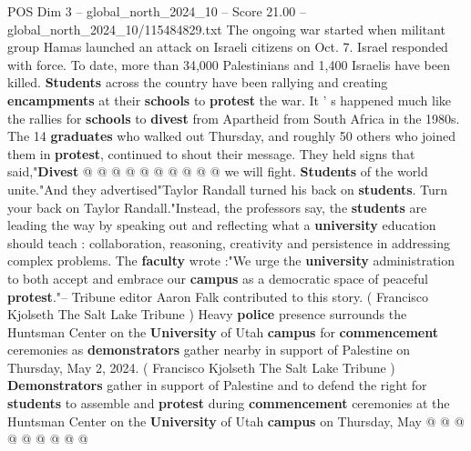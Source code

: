 \begin{textsample}{POS Dim 3 – global\_north\_2024\_10 – Score 21.00 – global\_north\_2024\_10/115484829.txt}
The ongoing war started when militant group Hamas launched an attack on Israeli citizens on Oct. 7.
Israel responded with force.
To date, more than 34,000 Palestinians and 1,400 Israelis have been killed. \textbf{Students} across the country have been rallying and creating \textbf{encampments} at their \textbf{schools} to \textbf{protest} the war.
It ' s happened much like the rallies for \textbf{schools} to \textbf{divest} from Apartheid from South Africa in the 1980s.
The 14 \textbf{graduates} who walked out Thursday, and roughly 50 others who joined them in \textbf{protest}, continued to shout their message.
They held signs that said,"\textbf{Divest} @ @ @ @ @ @ @ @ @ @ we will fight. \textbf{Students} of the world unite."And they advertised"Taylor Randall turned his back on \textbf{students}.
Turn your back on Taylor Randall."Instead, the professors say, the \textbf{students} are leading the way by speaking out and reflecting what a \textbf{university} education should teach : collaboration, reasoning, creativity and persistence in addressing complex problems.
The \textbf{faculty} wrote :"We urge the \textbf{university} administration to both accept and embrace our \textbf{campus} as a democratic space of peaceful \textbf{protest}."-- Tribune editor Aaron Falk contributed to this story. ( Francisco Kjolseth The Salt Lake Tribune ) Heavy \textbf{police} presence surrounds the Huntsman Center on the \textbf{University} of Utah \textbf{campus} for \textbf{commencement} ceremonies as \textbf{demonstrators} gather nearby in support of Palestine on Thursday, May 2, 2024. ( Francisco Kjolseth The Salt Lake Tribune ) \textbf{Demonstrators} gather in support of Palestine and to defend the right for \textbf{students} to assemble and \textbf{protest} during \textbf{commencement} ceremonies at the Huntsman Center on the \textbf{University} of Utah \textbf{campus} on Thursday, May @ @ @ @ @ @ @ @ @

\end{textsample}
